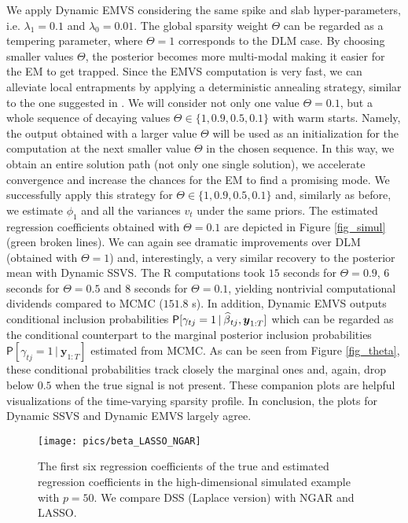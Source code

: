\documentclass[ba]{imsart}
\numberwithin{equation}{section}
\theoremstyle{plain}
\def\y{\mbox{\boldmath$y$}}
\newcommand{\bm}[1]{\boldsymbol{#1}}
\renewcommand{\P}{\mathsf{P}}
\newcommand{\wh}[1]{\smash{\widehat{#1}}}
\def\C {\,|\:}
\def\C {\,|\:}
\def\y{\bm{y}}
\begin{document}
{We apply Dynamic EMVS considering the same spike and slab hyper-parameters, i.e.  $\lambda_1=0.1$ and $\lambda_0=0.01$. The global sparsity weight $\Theta$ can be regarded as a tempering parameter, where $\Theta=1$ corresponds to the DLM case. By choosing smaller values $\Theta$, the posterior becomes more multi-modal making it easier for the EM to get trapped. Since the EMVS computation is very fast, we can alleviate local entrapments by applying a deterministic annealing strategy,  similar to the one suggested in \cite{RG14}. We will consider not only one value $\Theta=0.1$, but a whole sequence of decaying values $\Theta\in\{1,0.9,0.5,0.1\}$ with warm starts. 
Namely, the output obtained with a larger value $\Theta$ will be used as an initialization for the computation at the next smaller value $\Theta$ in the chosen sequence.
 In this way, we obtain an entire solution path (not only one single solution), we accelerate convergence and  increase the chances for the EM to find a promising mode. 
  We successfully apply this  strategy for $\Theta\in\{1,0.9,0.5,0.1\}$ and, similarly as before,  we estimate $\phi_1$ and all the variances $v_t$ under the same priors. The  estimated regression coefficients obtained with $\Theta=0.1$ are depicted in Figure \ref{fig_simul} (green broken lines). We can again see dramatic improvements over DLM (obtained with $\Theta=1$) and, interestingly, a very similar recovery to the posterior mean with Dynamic SSVS.
    The R computations  took $15$ seconds for $\Theta=0.9$,  $6$ seconds for $\Theta=0.5$ and $8$ seconds for $\Theta=0.1$, yielding nontrivial computational dividends compared to MCMC ($151.8$ s). In addition,  Dynamic EMVS outputs conditional inclusion probabilities $\P[\gamma_{tj}=1\C\wh\beta_{tj},\y_{1:T}]$ which can be regarded as the conditional counterpart to the marginal posterior inclusion probabilities $\P[\gamma_{tj}=1\C \y_{1:T}]$ estimated from MCMC. As can be seen from Figure  \ref{fig_theta}, these conditional probabilities track closely the marginal  ones  and, again,  drop below $0.5$ when the true signal is not present. 
  These companion plots are helpful visualizations of the time-varying sparsity profile. In conclusion, the plots for Dynamic SSVS and Dynamic EMVS largely agree.



 \begin{figure}[t!]
\begin{center}
\texttt{[image: pics/beta\_LASSO\_NGAR]}
\end{center}
\caption{The first six regression coefficients of the true and estimated  regression coefficients in  the high-dimensional simulated example with $p=50$. 
We compare DSS (Laplace version) with NGAR and LASSO.}\label{fig_demvs}
\end{figure}





}
\end{document}
